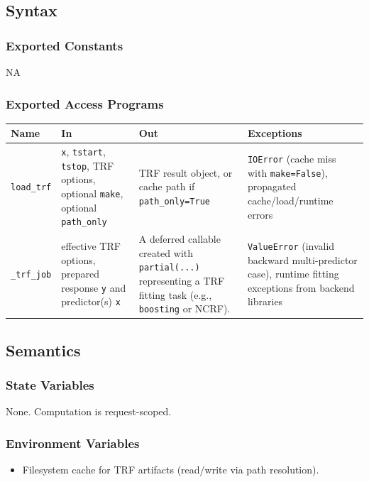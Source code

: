 \documentclass[12pt, titlepage]{article}
\begin{document}
\subsection{Syntax}

\subsubsection{Exported Constants}
NA

\subsubsection{Exported Access Programs}

\begin{center}
\begin{tabular}{p{3cm} p{4cm} p{4cm} p{3cm}}
\hline
\textbf{Name} & \textbf{In} & \textbf{Out} & \textbf{Exceptions} \\
\hline
\texttt{load\_trf} & 
\texttt{x}, \texttt{tstart}, \texttt{tstop}, TRF options, optional \texttt{make}, optional \texttt{path\_only} &
TRF result object, or cache path if \texttt{path\_only=True} &
\texttt{IOError} (cache miss with \texttt{make=False}), propagated cache/load/runtime errors \\
\texttt{\_trf\_job} & 
effective TRF options, prepared response \texttt{y} and predictor(s) \texttt{x} &
A deferred callable created with \texttt{partial(...)}\, representing a TRF fitting task (e.g., \texttt{boosting} or NCRF). &
\texttt{ValueError} (invalid backward multi-predictor case), runtime fitting exceptions from backend libraries \\
\hline
\end{tabular}
\end{center}

\subsection{Semantics}

\subsubsection{State Variables}

None. Computation is request-scoped.

\subsubsection{Environment Variables}
\begin{itemize}
\item Filesystem cache for TRF artifacts (read/write via path resolution).

\end{itemize}
\end{document}

